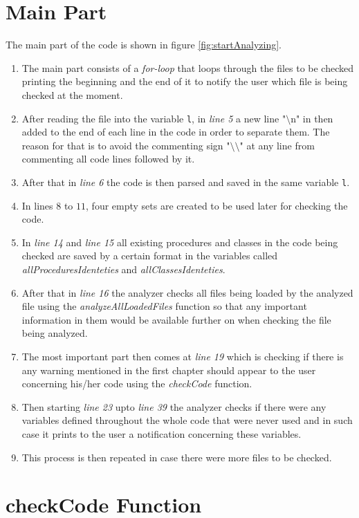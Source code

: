 \documentclass[11pt]{report}
\begin{document}
\section{Main Part}
The main part of the code is shown in figure \ref{fig:startAnalyzing}.
\begin{enumerate}
\item The main part consists of a \textsl{for-loop} that loops through the files to be checked printing the beginning and the end of it to notify the user which file is being checked at the moment. 
\item After reading the file into the variable \texttt{l}, in \textsl{line 5} a new line "$\setminus$n" in then added to the end of each line in the code in order to separate them. The reason for that is to avoid the commenting sign "$\setminus\setminus$" at any line from commenting all code lines followed by it.
\item After that in \textsl{line 6} the code is then parsed and saved in the same variable \texttt{l}.
\item In lines $8$ to $11$, four empty sets are created to be used later for checking the code.
\item In \textsl{line 14} and \textsl{line 15} all existing procedures and classes in the code being checked are saved by a certain format in the variables called \textsl{allProceduresIdenteties} and \textsl{allClassesIdenteties}.
\item After that in \textsl{line 16} the analyzer checks all files being loaded by the analyzed file using the \textsl{analyzeAllLoadedFiles} function so that any important information in them would be available further on when checking the file being analyzed.
\item The most important part then comes at \textsl{line 19} which is checking if there is any warning mentioned in the first chapter should appear to the user concerning his/her code using the \textsl{checkCode} function.
\item Then starting \textsl{line 23} upto \textsl{line 39} the analyzer checks if there were any variables defined throughout the whole code that were never used and in such case it prints to the user a notification concerning these variables.
\item This process is then repeated in case there were more files to be checked.
\end{enumerate}

\section{checkCode Function}
\end{document}
